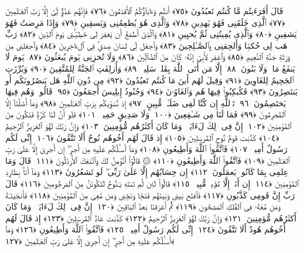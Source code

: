  قَالَ أَفَرَءَيتُم مَّا كُنتُم تَعبُدُونَ ﴿٧٥﴾
 أَنتُم وَءَابَآؤُكُمُ ٱلأَقدَمُونَ ﴿٧٦﴾
 فَإِنَّهُم عَدُوٌّۭ لِّىٓ إِلَّا رَبَّ ٱلعَـٰلَمِينَ ﴿٧٧﴾
 ٱلَّذِى خَلَقَنِى فَهُوَ يَهدِينِ ﴿٧٨﴾
 وَٱلَّذِى هُوَ يُطعِمُنِى وَيَسقِينِ ﴿٧٩﴾
 وَإِذَا مَرِضتُ فَهُوَ يَشفِينِ ﴿٨٠﴾
 وَٱلَّذِى يُمِيتُنِى ثُمَّ يُحيِينِ ﴿٨١﴾
 وَٱلَّذِىٓ أَطمَعُ أَن يَغفِرَ لِى خَطِيٓـَٔتِى يَومَ ٱلدِّينِ ﴿٨٢﴾
 رَبِّ هَب لِى حُكمًۭا وَأَلحِقنِى بِٱلصَّـٰلِحِينَ ﴿٨٣﴾
 وَٱجعَل لِّى لِسَانَ صِدقٍۢ فِى ٱلءَاخِرِينَ ﴿٨٤﴾
 وَٱجعَلنِى مِن وَرَثَةِ جَنَّةِ ٱلنَّعِيمِ ﴿٨٥﴾
 وَٱغفِر لِأَبِىٓ إِنَّهُۥ كَانَ مِنَ ٱلضَّآلِّينَ ﴿٨٦﴾
 وَلَا تُخزِنِى يَومَ يُبعَثُونَ ﴿٨٧﴾
 يَومَ لَا يَنفَعُ مَالٌۭ وَلَا بَنُونَ ﴿٨٨﴾
 إِلَّا مَن أَتَى ٱللَّهَ بِقَلبٍۢ سَلِيمٍۢ ﴿٨٩﴾
 وَأُزلِفَتِ ٱلجَنَّةُ لِلمُتَّقِينَ ﴿٩٠﴾
 وَبُرِّزَتِ ٱلجَحِيمُ لِلغَاوِينَ ﴿٩١﴾
 وَقِيلَ لَهُم أَينَ مَا كُنتُم تَعبُدُونَ ﴿٩٢﴾
 مِن دُونِ ٱللَّهِ هَل يَنصُرُونَكُم أَو يَنتَصِرُونَ ﴿٩٣﴾
 فَكُبكِبُوا۟ فِيهَا هُم وَٱلغَاوُۥنَ ﴿٩٤﴾
 وَجُنُودُ إِبلِيسَ أَجمَعُونَ ﴿٩٥﴾
 قَالُوا۟ وَهُم فِيهَا يَختَصِمُونَ ﴿٩٦﴾
 تَٱللَّهِ إِن كُنَّا لَفِى ضَلَـٰلٍۢ مُّبِينٍ ﴿٩٧﴾
 إِذ نُسَوِّيكُم بِرَبِّ ٱلعَـٰلَمِينَ ﴿٩٨﴾
 وَمَآ أَضَلَّنَآ إِلَّا ٱلمُجرِمُونَ ﴿٩٩﴾
 فَمَا لَنَا مِن شَـٰفِعِينَ ﴿١٠٠﴾
 وَلَا صَدِيقٍ حَمِيمٍۢ ﴿١٠١﴾
 فَلَو أَنَّ لَنَا كَرَّةًۭ فَنَكُونَ مِنَ ٱلمُؤمِنِينَ ﴿١٠٢﴾
 إِنَّ فِى ذَٟلِكَ لَءَايَةًۭ ۖ وَمَا كَانَ أَكثَرُهُم مُّؤمِنِينَ ﴿١٠٣﴾
 وَإِنَّ رَبَّكَ لَهُوَ ٱلعَزِيزُ ٱلرَّحِيمُ ﴿١٠٤﴾
 كَذَّبَت قَومُ نُوحٍ ٱلمُرسَلِينَ ﴿١٠٥﴾
 إِذ قَالَ لَهُم أَخُوهُم نُوحٌ أَلَا تَتَّقُونَ ﴿١٠٦﴾
 إِنِّى لَكُم رَسُولٌ أَمِينٌۭ ﴿١٠٧﴾
 فَٱتَّقُوا۟ ٱللَّهَ وَأَطِيعُونِ ﴿١٠٨﴾
 وَمَآ أَسـَٔلُكُم عَلَيهِ مِن أَجرٍ ۖ إِن أَجرِىَ إِلَّا عَلَىٰ رَبِّ ٱلعَـٰلَمِينَ ﴿١٠٩﴾
 فَٱتَّقُوا۟ ٱللَّهَ وَأَطِيعُونِ ﴿١١٠﴾
 ۞ قَالُوٓا۟ أَنُؤمِنُ لَكَ وَٱتَّبَعَكَ ٱلأَرذَلُونَ ﴿١١١﴾
 قَالَ وَمَا عِلمِى بِمَا كَانُوا۟ يَعمَلُونَ ﴿١١٢﴾
 إِن حِسَابُهُم إِلَّا عَلَىٰ رَبِّى ۖ لَو تَشعُرُونَ ﴿١١٣﴾
 وَمَآ أَنَا۠ بِطَارِدِ ٱلمُؤمِنِينَ ﴿١١٤﴾
 إِن أَنَا۠ إِلَّا نَذِيرٌۭ مُّبِينٌۭ ﴿١١٥﴾
 قَالُوا۟ لَئِن لَّم تَنتَهِ يَـٰنُوحُ لَتَكُونَنَّ مِنَ ٱلمَرجُومِينَ ﴿١١٦﴾
 قَالَ رَبِّ إِنَّ قَومِى كَذَّبُونِ ﴿١١٧﴾
 فَٱفتَح بَينِى وَبَينَهُم فَتحًۭا وَنَجِّنِى وَمَن مَّعِىَ مِنَ ٱلمُؤمِنِينَ ﴿١١٨﴾
 فَأَنجَينَـٰهُ وَمَن مَّعَهُۥ فِى ٱلفُلكِ ٱلمَشحُونِ ﴿١١٩﴾
 ثُمَّ أَغرَقنَا بَعدُ ٱلبَاقِينَ ﴿١٢٠﴾
 إِنَّ فِى ذَٟلِكَ لَءَايَةًۭ ۖ وَمَا كَانَ أَكثَرُهُم مُّؤمِنِينَ ﴿١٢١﴾
 وَإِنَّ رَبَّكَ لَهُوَ ٱلعَزِيزُ ٱلرَّحِيمُ ﴿١٢٢﴾
 كَذَّبَت عَادٌ ٱلمُرسَلِينَ ﴿١٢٣﴾
 إِذ قَالَ لَهُم أَخُوهُم هُودٌ أَلَا تَتَّقُونَ ﴿١٢٤﴾
 إِنِّى لَكُم رَسُولٌ أَمِينٌۭ ﴿١٢٥﴾
 فَٱتَّقُوا۟ ٱللَّهَ وَأَطِيعُونِ ﴿١٢٦﴾
 وَمَآ أَسـَٔلُكُم عَلَيهِ مِن أَجرٍ ۖ إِن أَجرِىَ إِلَّا عَلَىٰ رَبِّ ٱلعَـٰلَمِينَ ﴿١٢٧﴾
